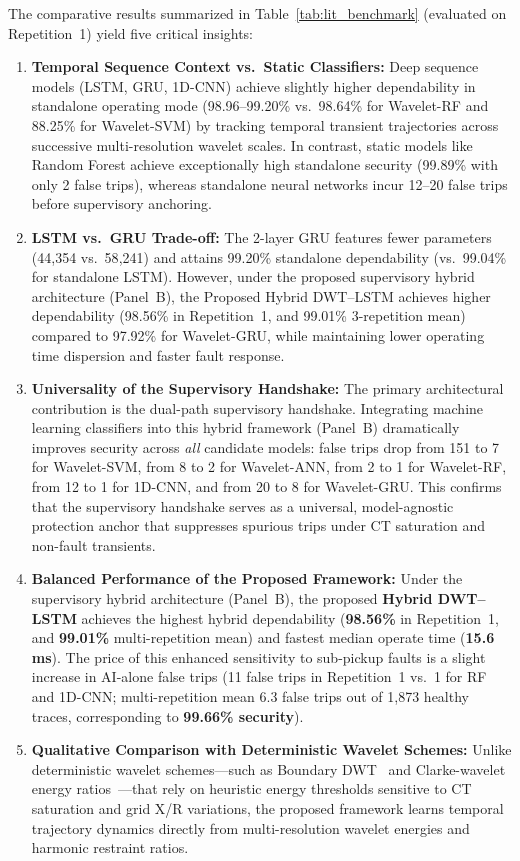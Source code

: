 \documentclass[12pt,a4paper,oneside]{report}
\begin{document}
The comparative results summarized in Table~\ref{tab:lit_benchmark} (evaluated on Repetition~1) yield five critical insights:
\begin{enumerate}[leftmargin=1.4em,itemsep=1.5pt,topsep=2pt,parsep=0pt]
\item \textbf{Temporal Sequence Context vs.\ Static Classifiers:} Deep sequence models (LSTM, GRU, 1D-CNN) achieve slightly higher dependability in standalone operating mode (98.96--99.20\% vs.\ 98.64\% for Wavelet-RF and 88.25\% for Wavelet-SVM) by tracking temporal transient trajectories across successive multi-resolution wavelet scales. In contrast, static models like Random Forest achieve exceptionally high standalone security (99.89\% with only 2 false trips), whereas standalone neural networks incur 12--20 false trips before supervisory anchoring.
\item \textbf{LSTM vs.\ GRU Trade-off:} The 2-layer GRU features fewer parameters (44{,}354 vs.\ 58{,}241) and attains 99.20\% standalone dependability (vs.\ 99.04\% for standalone LSTM). However, under the proposed supervisory hybrid architecture (Panel~B), the Proposed Hybrid DWT--LSTM achieves higher dependability (98.56\% in Repetition~1, and 99.01\% 3-repetition mean) compared to 97.92\% for Wavelet-GRU, while maintaining lower operating time dispersion and faster fault response.
\item \textbf{Universality of the Supervisory Handshake:} The primary architectural contribution is the dual-path supervisory handshake. Integrating machine learning classifiers into this hybrid framework (Panel~B) dramatically improves security across \textit{all} candidate models: false trips drop from 151 to 7 for Wavelet-SVM, from 8 to 2 for Wavelet-ANN, from 2 to 1 for Wavelet-RF, from 12 to 1 for 1D-CNN, and from 20 to 8 for Wavelet-GRU. This confirms that the supervisory handshake serves as a universal, model-agnostic protection anchor that suppresses spurious trips under CT saturation and non-fault transients.
\item \textbf{Balanced Performance of the Proposed Framework:} Under the supervisory hybrid architecture (Panel~B), the proposed \textbf{Hybrid DWT--LSTM} achieves the highest hybrid dependability (\textbf{98.56\%} in Repetition~1, and \textbf{99.01\%} multi-repetition mean) and fastest median operate time (\textbf{15.6\,ms}). The price of this enhanced sensitivity to sub-pickup faults is a slight increase in AI-alone false trips (11 false trips in Repetition~1 vs.\ 1 for RF and 1D-CNN; multi-repetition mean 6.3 false trips out of 1{,}873 healthy traces, corresponding to \textbf{99.66\% security}).
\item \textbf{Qualitative Comparison with Deterministic Wavelet Schemes:} Unlike deterministic wavelet schemes—such as Boundary DWT~\cite{ref38} and Clarke-wavelet energy ratios~\cite{ref39}—that rely on heuristic energy thresholds sensitive to CT saturation and grid X/R variations, the proposed framework learns temporal trajectory dynamics directly from multi-resolution wavelet energies and harmonic restraint ratios.
\end{enumerate}
\end{document}
